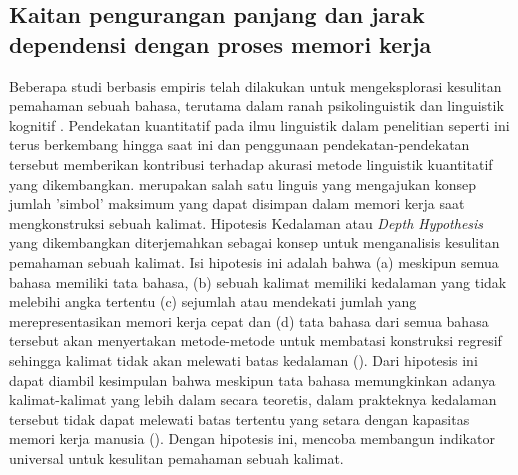 \subsection{Kaitan pengurangan panjang dan jarak dependensi dengan proses memori kerja}
Beberapa studi berbasis empiris telah dilakukan untuk mengeksplorasi kesulitan pemahaman sebuah bahasa, terutama dalam ranah psikolinguistik dan linguistik kognitif \citep{jay2003psychology}. Pendekatan kuantitatif pada ilmu linguistik dalam penelitian seperti ini terus berkembang hingga saat ini dan penggunaan pendekatan-pendekatan tersebut memberikan kontribusi terhadap akurasi metode linguistik kuantitatif yang dikembangkan. \cite{yngve1960model} merupakan salah satu linguis yang mengajukan konsep jumlah 'simbol' maksimum yang dapat disimpan dalam memori kerja saat mengkonstruksi sebuah kalimat. Hipotesis Kedalaman atau \textit{Depth Hypothesis} yang dikembangkan \cite{yngve1960model} diterjemahkan sebagai konsep untuk menganalisis kesulitan pemahaman sebuah kalimat. Isi hipotesis ini adalah bahwa (a) meskipun semua bahasa memiliki tata bahasa, (b) sebuah kalimat memiliki kedalaman yang tidak melebihi angka tertentu (c) sejumlah atau mendekati jumlah yang merepresentasikan memori kerja cepat dan (d) tata bahasa dari semua bahasa tersebut akan menyertakan metode-metode untuk membatasi konstruksi regresif sehingga kalimat tidak akan melewati batas kedalaman (\citealp{yngve1960model, yngve1996grammar}). Dari hipotesis ini dapat diambil kesimpulan bahwa meskipun tata bahasa memungkinkan adanya kalimat-kalimat yang lebih dalam secara teoretis, dalam prakteknya kedalaman tersebut tidak dapat melewati batas tertentu yang setara dengan kapasitas memori kerja manusia (\citealp{miller1956magical,cowan2001metatheory}). Dengan hipotesis ini, \cite{yngve1960model} mencoba membangun indikator universal untuk kesulitan pemahaman sebuah kalimat. 

